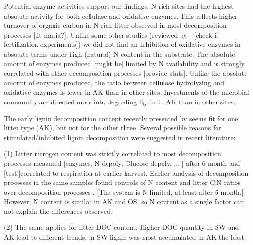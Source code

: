 Potential enzyme activities support our findings: N-rich sites had the highest absolute activity for both cellulase and oxidative enzymes. This reflects higher turnover of organic carbon in N-rich litter observed in most decomposition processes [lit maria?]. Unlike some other studies (reviewed by \cite{Sinsabaugh2010} - [check if fertilization experiments]) we did not find an inhibition of oxidative enzymes in absolute terms under high (natural) N content in the substrate. The absolute amount of enzymes produced [might be] limited by N availability and is strongly correlated with other decomposition processes [provide stats]. Unlike the absolute amount of enzymes produced, the ratio between cellulose hydrolyzing and oxidative enzymes is lower in AK than in other sites. Investments of the microbial community are directed more into degrading lignin in AK than in other sites.



The early lignin decomposition concept recently presented by \cite{Klotzbucher2011} seems fit for one litter type (AK), but not for the other three. Several possible reasons for stimulated/inhibited lignin decomposition were suggested in recent literature:

(1) Litter nitrogen content was strictly correlated to most decomposition processes measured [enzymes, N-depoly, Glucose-depoly, ... ] after 6 month and [test!]correlated to respiration at earlier harvest. Earlier analysis of decomposition processes in the same samples found controls of N content and litter C:N ratios over decomposition processes \citep{Mooshammer2011, Leitner2011}. [The system is N limited, at least after 6 month.] However, N content is similar in AK and OS, so N content as a single factor can not explain the differences observed.

(2) The same applies for litter DOC content: Higher DOC quantity in SW and AK lead to different trends, in SW lignin was most accumulated in AK the least.

